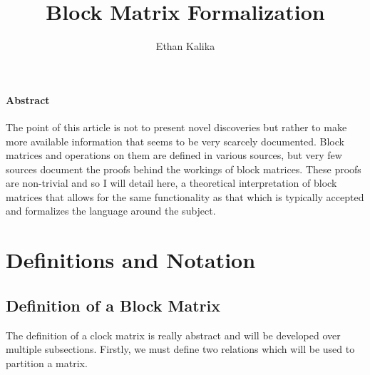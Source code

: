 \documentclass{article}
\title{Block Matrix Formalization}
\author{Ethan Kalika}
\begin{document}
\maketitle
\paragraph{Abstract}
The point of this article is not to present novel discoveries but rather to make more available information that seems to be very scarcely documented. Block matrices and operations on them are defined in various sources, but very few sources document the proofs behind the workings of block matrices. These proofs are non-trivial and so I will detail here, a theoretical interpretation of block matrices that allows for the same functionality as that which is typically accepted and formalizes the language around the subject.
\section{Definitions and Notation}
\subsection{Definition of a Block Matrix}
The definition of a clock matrix is really abstract and will be developed over multiple subsections. Firstly, we must define two relations which will be used to partition a matrix.
\end{document}
